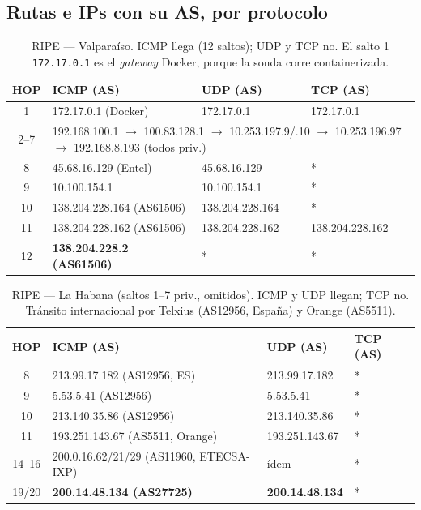 \documentclass[11pt,a4paper]{article}
\newcommand{\ip}[1]{\texttt{#1}}
\begin{document}
\subsection{Rutas e IPs con su AS, por protocolo}
\begin{table}[H]
\centering\footnotesize
\begin{tabular}{c|lll}
\toprule
HOP & ICMP (AS) & UDP (AS) & TCP (AS) \\
\midrule
1 & 172.17.0.1 (Docker) & 172.17.0.1 & 172.17.0.1 \\
2--7 & \multicolumn{3}{l}{192.168.100.1 $\to$ 100.83.128.1 $\to$ 10.253.197.9/.10 $\to$ 10.253.196.97 $\to$ 192.168.8.193 (todos priv.)} \\
8 & 45.68.16.129 (Entel) & 45.68.16.129 & * \\
9 & 10.100.154.1 & 10.100.154.1 & * \\
10 & 138.204.228.164 (AS61506) & 138.204.228.164 & * \\
11 & 138.204.228.162 (AS61506) & 138.204.228.162 & 138.204.228.162 \\
12 & \textbf{138.204.228.2 (AS61506)} & * & * \\
\bottomrule
\end{tabular}
\caption{RIPE --- Valparaíso. ICMP llega (12 saltos); UDP y TCP no. El salto 1 \ip{172.17.0.1}
es el \emph{gateway} Docker, porque la sonda corre containerizada.}
\end{table}

\begin{table}[H]
\centering\footnotesize
\begin{tabular}{c|lll}
\toprule
HOP & ICMP (AS) & UDP (AS) & TCP (AS) \\
\midrule
8 & 213.99.17.182 (AS12956, ES) & 213.99.17.182 & * \\
9 & 5.53.5.41 (AS12956) & 5.53.5.41 & * \\
10 & 213.140.35.86 (AS12956) & 213.140.35.86 & * \\
11 & 193.251.143.67 (AS5511, Orange) & 193.251.143.67 & * \\
14--16 & 200.0.16.62/21/29 (AS11960, ETECSA-IXP) & ídem & * \\
19/20 & \textbf{200.14.48.134 (AS27725)} & \textbf{200.14.48.134} & * \\
\bottomrule
\end{tabular}
\caption{RIPE --- La Habana (saltos 1--7 priv., omitidos). ICMP y UDP llegan; TCP no. Tránsito
internacional por Telxius (AS12956, España) y Orange (AS5511).}
\end{table}
\end{document}
